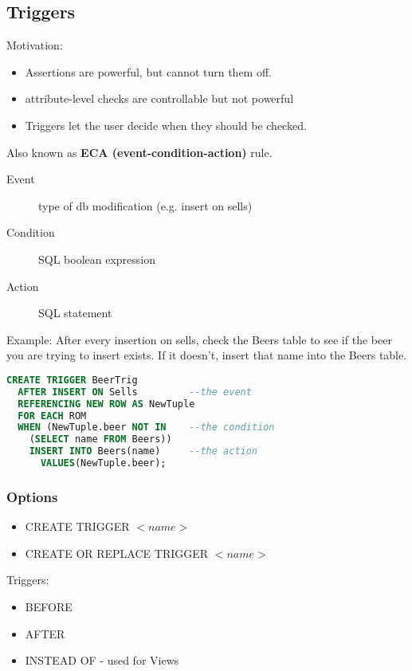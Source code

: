\documentclass[12pt]{article}
\begin{document}
\subsection{Triggers}
Motivation:
\begin{itemize}
  \item Assertions are powerful, but cannot turn them off.
  \item attribute-level checks are controllable but not powerful
  \item Triggers let the user decide when they should be checked.
\end{itemize}

Also known as \textbf{ECA (event-condition-action)} rule.
\begin{description}
  \item[Event] type of db modification (e.g. insert on sells)
  \item[Condition] SQL boolean expression
  \item[Action] SQL statement
\end{description}

Example: After every insertion on sells, check the Beers table to see if the
beer you are trying to insert exists. If it doesn't, insert that name into the
Beers table.
\begin{lstlisting}[language=sql,caption=Trigger definition]
  CREATE TRIGGER BeerTrig
  AFTER INSERT ON Sells         --the event
  REFERENCING NEW ROW AS NewTuple
  FOR EACH ROM
  WHEN (NewTuple.beer NOT IN    --the condition
    (SELECT name FROM Beers))
    INSERT INTO Beers(name)     --the action
      VALUES(NewTuple.beer);
\end{lstlisting}

\subsubsection{Options}
\begin{itemize}
  \item CREATE TRIGGER $<name>$
  \item {
    CREATE OR REPLACE TRIGGER $<name>$
  }
\end{itemize}
Triggers:
\begin{itemize}
  \item BEFORE
  \item AFTER
  \item INSTEAD OF - used for Views
\end{itemize}
\end{document}
